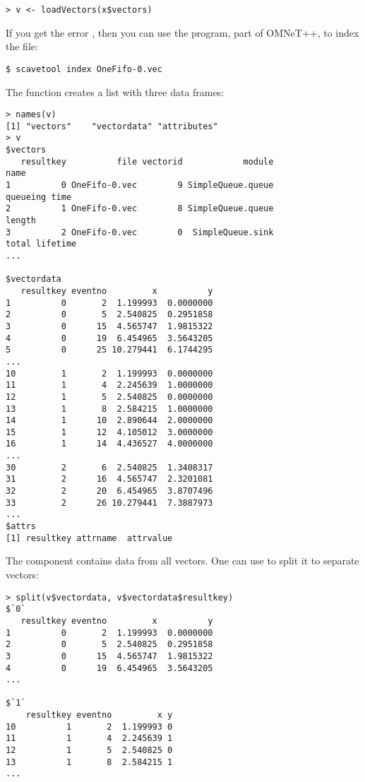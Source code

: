 \begin{verbatim}
> v <- loadVectors(x$vectors)
\end{verbatim}

If you get the error , then
you can use the  program, part of OMNeT++, to index the file:

\begin{verbatim}
$ scavetool index OneFifo-0.vec
\end{verbatim}

The  function creates a list with three data frames:

\begin{verbatim}
> names(v)
[1] "vectors"    "vectordata" "attributes"
> v
$vectors
   resultkey          file vectorid            module                          name
1          0 OneFifo-0.vec        9 SimpleQueue.queue                 queueing time
2          1 OneFifo-0.vec        8 SimpleQueue.queue                        length
3          2 OneFifo-0.vec        0  SimpleQueue.sink                total lifetime
...

$vectordata
   resultkey eventno         x          y
1          0       2  1.199993  0.0000000
2          0       5  2.540825  0.2951858
3          0      15  4.565747  1.9815322
4          0      19  6.454965  3.5643205
5          0      25 10.279441  6.1744295
...
10         1       2  1.199993  0.0000000
11         1       4  2.245639  1.0000000
12         1       5  2.540825  0.0000000
13         1       8  2.584215  1.0000000
14         1      10  2.890644  2.0000000
15         1      12  4.105012  3.0000000
16         1      14  4.436527  4.0000000
...
30         2       6  2.540825  1.3408317
31         2      16  4.565747  2.3201081
32         2      20  6.454965  3.8707496
33         2      26 10.279441  7.3887973
...
$attrs
[1] resultkey attrname  attrvalue
\end{verbatim}

The  component contains data from all vectors.
One can use  to split it to separate vectors:

\begin{verbatim}
> split(v$vectordata, v$vectordata$resultkey)
$`0`
   resultkey eventno         x          y
1          0       2  1.199993  0.0000000
2          0       5  2.540825  0.2951858
3          0      15  4.565747  1.9815322
4          0      19  6.454965  3.5643205
...

$`1`
    resultkey eventno         x y
10          1       2  1.199993 0
11          1       4  2.245639 1
12          1       5  2.540825 0
13          1       8  2.584215 1
...
\end{verbatim}

